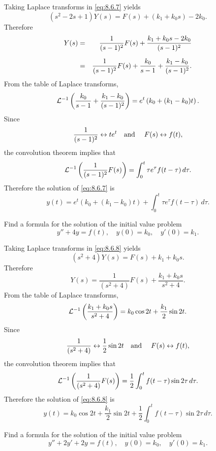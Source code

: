 \begin{examplesolution}
\solution Taking Laplace transforms in \eqref{eq:8.6.7} yields
\[
  (s^{2}-2s+1)Y(s)=F(s)+(k_{1}+k_{0}s)-2k_{0}.
\]
Therefore
\begin{eqnarray*}
  Y(s) & = & \frac{1}{(s-1)^{2}}F(s)+\frac{k_{1}+k_{0}s-2k_{0}}{(s-1)^{2}} \\[2\jot]
       & = & \frac{1}{(s-1)^{2}}F(s)+\frac{k_{0}}{s-1}+\frac{k_{1}-k_{0}}{(s-1)^{2}}.
\end{eqnarray*}
From the table of Laplace transforms,
\[
  {\cal L}^{-1}\left(\frac{k_{0}}{s-1}+\frac{k_{1}-k_{0}}{(s-1)^{2}}\right) =e^{t}\left(k_{0}+(k_{1}-k_{0})t\right).
\]
Since
\[
  \frac{1}{(s-1)^{2}}\leftrightarrow te^{t}\mbox{\quad and \quad }F(s) \leftrightarrow f(t),
\]
the convolution theorem implies that
\[
  {\cal L}^{-1}\left(\frac{1}{(s-1)^{2}}F(s)\right)= \int_{0}^{t}\tau e^{\tau}f(t-\tau)\,d\tau.
\]
Therefore the solution of \eqref{eq:8.6.7} is
\[
  y(t)=e^{t}\left(k_{0}+(k_{1}-k_{0})t\right)+\int_{0}^{t}\tau e^{\tau}f(t-\tau)\, d\tau.
\]
\end{examplesolution}

\begin{example}
  \label{example:8.6.3}\rm Find a formula for the solution of the initial value problem
  \begin{equation}
    \label{eq:8.6.8}y''+4y=f(t),\quad y(0)=k_{0},\quad y'(0)=k_{1}.
  \end{equation}
\end{example}

\begin{examplesolution}
\solution Taking Laplace transforms in \eqref{eq:8.6.8} yields
\[
  (s^{2}+4)Y(s)=F(s)+k_{1}+k_{0}s.
\]
Therefore
\[
  Y(s)=\frac{1}{(s^{2}+4)}F(s)+\frac{k_{1}+k_{0}s}{s^{2}+4}.
\]
From the table of Laplace transforms,
\[
  {\cal L}^{-1}\left(\frac{k_{1}+k_{0}s}{s^{2}+4}\right)=k_{0}\cos2t+\frac{k_{1}}{2}\sin2t.
\]
Since
\[
  \frac{1}{(s^{2}+4)}\leftrightarrow\frac{1}{2}\sin2t\mbox{\quad and \quad}F(s)\leftrightarrow f(t),
\]
the convolution theorem implies that
\[
  {\cal L}^{-1}\left(\frac{1}{(s^{2}+4)}F(s)\right)= \frac{1}{2}\int_{0}^{t}f(t-\tau)\sin2\tau\, d\tau.
\]
Therefore the solution of \eqref{eq:8.6.8} is
\[
  y(t)=k_{0}\cos2t+\frac{k_{1}}{2}\sin2t+\frac{1}{2}\int_{0}^{t}f(t-\tau)\sin 2\tau\,d\tau.
\]
\end{examplesolution}

\begin{example}
  \label{example:8.6.4}\rm Find a formula for the solution of the initial value problem
  \begin{equation}
    \label{eq:8.6.9}y''+2y'+2y=f(t),\quad y(0)=k_{0},\quad y'(0)=k_{1}.
  \end{equation}
\end{example}


